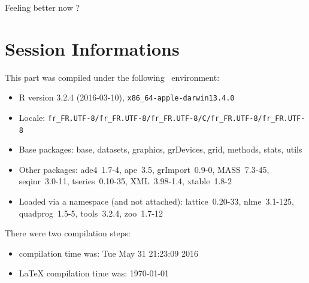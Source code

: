 \documentclass{article}
\begin{document}
\noindent Feeling better now ?


\section*{Session Informations}

\begin{scriptsize}

This part was compiled under the following \Rlogo{}~environment:

\begin{itemize}\raggedright
  \item R version 3.2.4 (2016-03-10), \verb|x86_64-apple-darwin13.4.0|
  \item Locale: \verb|fr_FR.UTF-8/fr_FR.UTF-8/fr_FR.UTF-8/C/fr_FR.UTF-8/fr_FR.UTF-8|
  \item Base packages: base, datasets, graphics, grDevices, grid,
    methods, stats, utils
  \item Other packages: ade4~1.7-4, ape~3.5, grImport~0.9-0,
    MASS~7.3-45, seqinr~3.0-11, tseries~0.10-35, XML~3.98-1.4,
    xtable~1.8-2
  \item Loaded via a namespace (and not attached): lattice~0.20-33,
    nlme~3.1-125, quadprog~1.5-5, tools~3.2.4, zoo~1.7-12
\end{itemize}
There were two compilation steps:

\begin{itemize}
  \item \Rlogo{} compilation time was: Tue May 31 21:23:09 2016
  \item \LaTeX{} compilation time was: \today
\end{itemize}

\end{scriptsize}


\clearpage
{}


\end{document}
